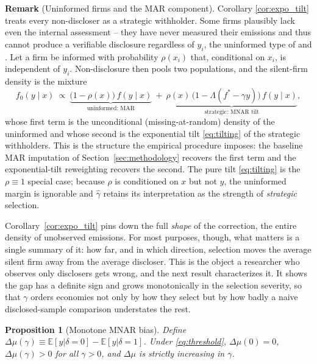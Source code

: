 \documentclass[a4paper,12pt]{article}
\newcommand{\citet}[1]{\textcite{#1}}
\newtheorem{proposition}[theorem]{Proposition}
\begin{document}
\textbf{Remark} (Uninformed firms and the MAR component). Corollary \ref{cor:expo_tilt} treats every non-discloser as a strategic withholder. Some firms plausibly lack even the internal assessment -- they have never measured their emissions and thus cannot produce a verifiable disclosure regardless of $y_i$, the uninformed type of \citet{dye1985disclosure} and \citet{jung1988disclosure}. Let a firm be informed with probability $\rho(x_i)$ that, conditional on $x_i$, is independent of $y_i$. Non-disclosure then pools two populations, and the silent-firm density is the mixture
\begin{equation}
\label{eq:tilting_mixture}
    f_0(y \mid x) \ \propto\ \underbrace{\big(1-\rho(x)\big)\, f(y \mid x)}_{\text{uninformed: MAR}}\ +\ \underbrace{\rho(x)\,\big(1 - \Lambda(f^* - \gamma y)\big)\, f(y \mid x)}_{\text{strategic: MNAR tilt}},
\end{equation}
whose first term is the unconditional (missing-at-random) density of the uninformed and whose second is the exponential tilt \eqref{eq:tilting} of the strategic withholders. This is the structure the empirical procedure imposes: the baseline MAR imputation of Section~\ref{sec:methodology} recovers the first term and the exponential-tilt reweighting recovers the second. The pure tilt \eqref{eq:tilting} is the $\rho \equiv 1$ special case; because $\rho$ is conditioned on $x$ but not $y$, the uninformed margin is ignorable and $\hat\gamma$ retains its interpretation as the strength of \emph{strategic} selection.

Corollary~\ref{cor:expo_tilt} pins down the full \emph{shape} of the correction, the entire density of unobserved emissions. For most purposes, though, what matters is a single summary of it: how far, and in which direction, selection moves the average silent firm away from the average discloser. This is the object a researcher who observes only disclosers gets wrong, and the next result characterizes it. It shows the gap has a definite sign and grows monotonically in the selection severity, so that $\gamma$ orders economies not only by how they select but by how badly a naive disclosed-sample comparison understates the rest.

\begin{proposition}[Monotone MNAR bias] \label{prop:mnar_bias}
Define $\Delta \mu(\gamma) \equiv \mathbb{E}[y|\delta =0] - \mathbb{E}[y|\delta =1]$. Under \eqref{eq:threshold}, $\Delta \mu(0) = 0$, $\Delta \mu(\gamma) > 0$ for all $\gamma > 0$, and $\Delta \mu$ is strictly increasing in $\gamma$. 
\end{proposition}
\end{document}
